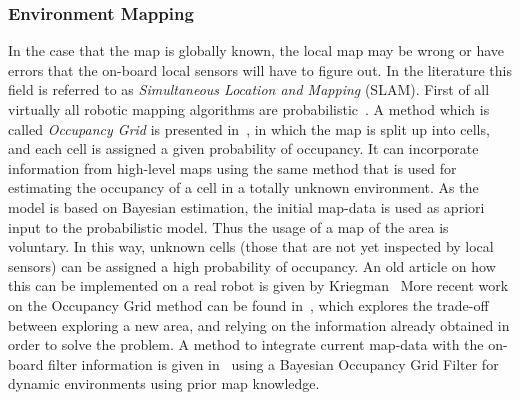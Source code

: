 \subsubsection{Environment Mapping}
In the case that the map is globally known, the local map may be wrong or have
errors that the on-board local sensors will have to figure out. In the
literature this field is referred to as \textit{Simultaneous Location and
  Mapping} (SLAM). First of all virtually all robotic mapping algorithms are
probabilistic~\cite{thrunRoboticMappingSurvey}. %
A method which is called \textit{Occupancy Grid} is presented
in~\cite{elfes1989using}, in which the map is split up into cells, and each cell
is assigned a given probability of occupancy. It can incorporate information
from high-level maps using the same method that is used for estimating the
occupancy of a cell in a totally unknown environment. As the model is based on
Bayesian estimation, the initial map-data is used as apriori input to the
probabilistic model. Thus the usage of a map of the area is voluntary. In this
way, unknown cells (those that are not yet inspected by local sensors) can be
assigned a high probability of occupancy. An old article on how this can be
implemented on a real robot is given by Kriegman~\cite{kriegman1987mobile} More
recent work on the Occupancy Grid method can be found in~\cite{7139224}, which
explores the trade-off between exploring a new area, and relying on the
information already obtained in order to solve the problem. A method to
integrate current map-data with the on-board filter information is given
in~\cite{gindeleBayesianOccupancyGrid2009} using a Bayesian Occupancy Grid
Filter for dynamic environments using prior map knowledge.

